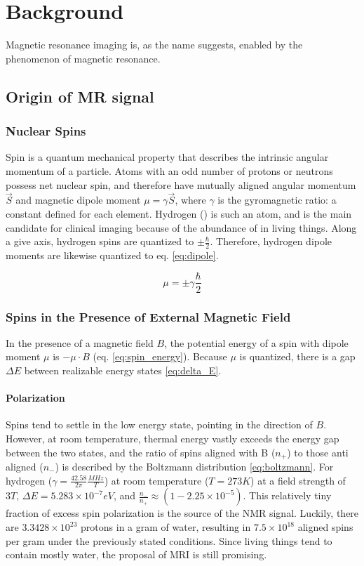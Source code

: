 \chapter{Background}
Magnetic resonance imaging is, as the name suggests, enabled by the phenomenon of magnetic resonance.

\section{Origin of MR signal}

\subsection{Nuclear Spins}

Spin is a quantum mechanical property that describes the intrinsic angular momentum of a particle. Atoms with an odd
number of protons or neutrons possess net nuclear spin, and therefore have mutually aligned angular momentum $\vec{S}$
and magnetic dipole moment $\mu= \gamma \vec{S}$, where $\gamma$ is the gyromagnetic ratio: a constant defined for each
element. Hydrogen () is such an atom, and is the main candidate for clinical imaging because of the
abundance of  in living things. Along a give axis, hydrogen spins are quantized to $\pm \frac{\hbar}2$.
Therefore, hydrogen dipole moments are likewise quantized to eq. \ref{eq:dipole}.

\begin{equation}\label{eq:dipole}
    \mu = \pm \gamma \frac{\hbar}{2}
\end{equation}

\subsection{Spins in the Presence of External Magnetic Field}

In the presence of a magnetic field $B$, the potential energy of a spin with dipole moment $\mu$ is $-\mu \cdot B$ (eq.
\ref{eq:spin_energy}). Because $\mu$ is quantized, there is a gap $\Delta E$ between realizable energy states
\ref{eq:delta_E}.

\subsubsection{Polarization}
Spins tend to settle in the low energy state, pointing in the direction of $B$. However, at room temperature, thermal
energy vastly exceeds the energy gap between the two states, and the ratio of spins aligned with B ($n_+$) to those anti
aligned ($n_-$) is described by the Boltzmann distribution \ref{eq:boltzmann}. For hydrogen ($\gamma =
\frac{42.58}{2\pi} \frac{MHz}{T}$) at room temperature ($T=273 K$) at a field strength of $3T$, $\Delta E = 5.283 \times
10^{-7} eV$, and $\frac{n_-}{n_+} \approx (1 - 2.25 \times 10^{-5})$. This relatively tiny fraction of excess spin
polarization is the source of the NMR signal. Luckily, there are $3.3428 \times 10^{23}$ protons in a gram of water,
resulting in $7.5 \times 10^{18}$ aligned spins per gram under the previously stated conditions. Since living things
tend to contain mostly water, the proposal of MRI is still promising.

